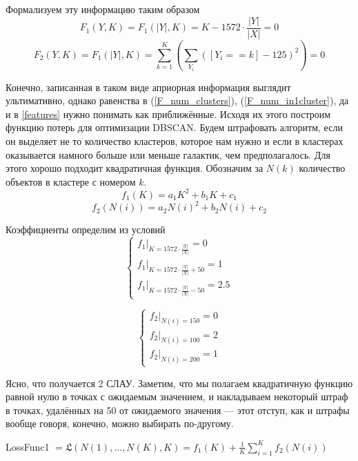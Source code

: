 \documentclass[12pt,fleqn]{article}
\begin{document}
Формализуем эту информацию таким образом
\begin{equation}\label{F_num_clusters}
  F_1(Y, K) = F_1(|Y|, K) = K -  1572\cdot \frac{|Y|}{|X|} = 0
\end{equation}
\begin{equation}\label{F_num_in1cluster}
  F_2(Y, K) = F_1(|Y|, K) = \sum_{k=1}^K \left(\sum_{Y_i}^{} \left([Y_i==k]-125\right)^2\right) = 0
\end{equation}

Конечно, записанная в таком виде априорная информация выглядит ультимативно, однако равенства в (\ref{F_num_clusters}), (\ref{F_num_in1cluster}), да и в \ref{features} нужно понимать как приближённые. Исходя их этого построим функцию потерь для оптимизации DBSCAN. Будем штрафовать алгоритм, если он выделяет не то количество кластеров, которое нам нужно и если в кластерах оказывается намного больше или меньше галактик, чем предполагалось. Для этого хорошо подходит квадратичная функция. Обозначим за $N(k)$ количество объектов в кластере с номером $k$.
$$f_1(K) = a_1K^2 + b_1K + c_1$$
$$f_2(N(i)) = a_2N(i)^2 + b_2N(i) + c_2$$

Коэффициенты определим из условий
\begin{equation}\label{system_num_cl}
 \begin{cases}
   f_1|_{K=1572 \cdot \frac{|Y|}{|X|}} = 0
   \\
   f_1|_{K=1572 \cdot \frac{|Y|}{|X|} + 50} = 1
   \\
   f_1|_{K=1572 \cdot \frac{|Y|}{|X|} - 50} = 2.5
 \end{cases}
\end{equation}

\begin{equation}\label{system_num_in1cl}
 \begin{cases}
   f_2|_{N(i)=150} = 0
   \\
   f_2|_{N(i)=100} = 2
   \\
   f_2|_{N(i)=200} = 1
 \end{cases}
\end{equation}


Ясно, что получается 2 СЛАУ. Заметим, что мы полагаем квадратичную функцию равной нулю в точках с ожидаемым значением, и накладываем некоторый штраф в точках, удалённых на 50 от ожидаемого значения --- этот отступ, как и штрафы вообще говоря, конечно, можно выбирать по-другому.

LossFunc1 $= \mathfrak{L}(N(1), \dots, N(K), K) = f_1(K) + \frac{1}{K} \sum_{i=1}^{K}f_2(N(i))$
\end{document}
